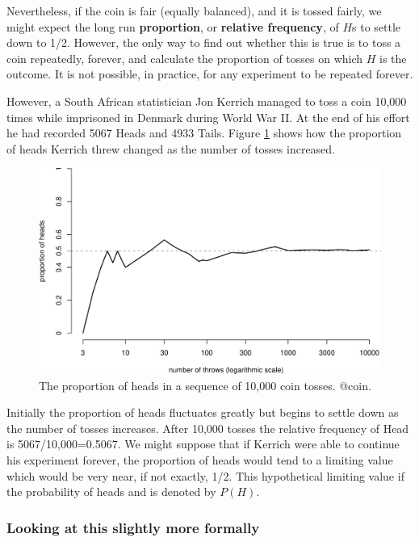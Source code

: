 \documentclass[
  british,
]{book}
\begin{document}
Nevertheless, if the coin is fair (equally balanced), and it is tossed fairly, we might expect the long run \textbf{proportion}, or \textbf{relative frequency}, of \(H\)s to settle down to 1/2. However, the only way to find out whether this is true is to toss a coin repeatedly, forever, and calculate the proportion of tosses on which \(H\) is the outcome. It is not possible, in practice, for any experiment to be repeated forever.

However, a South African statistician Jon Kerrich managed to toss a coin
10,000 times while imprisoned in Denmark during World War II. At the end of his
effort he had recorded 5067 Heads and 4933 Tails. Figure \ref{fig:coin} shows
how the proportion of heads Kerrich threw changed as the number of tosses increased.

\begin{figure}

{\centering \includegraphics[width=0.8\linewidth]{images/coin} 

}

\caption{The proportion of heads in a sequence of 10,000 coin tosses. @coin.}\label{fig:coin}
\end{figure}
\FloatBarrier

Initially the proportion of heads fluctuates greatly but begins to settle down as the number of tosses increases. After 10,000 tosses the relative frequency of Head is 5067/10,000=0.5067. We might suppose that if Kerrich were able to continue his experiment forever, the proportion of heads would tend to a limiting value which would be very near, if not exactly, 1/2. This hypothetical limiting value if the probability of heads and is denoted by \(P(H)\).

\hypertarget{looking-at-this-slightly-more-formally}{%
\subsubsection*{Looking at this slightly more formally}\label{looking-at-this-slightly-more-formally}}
\end{document}
